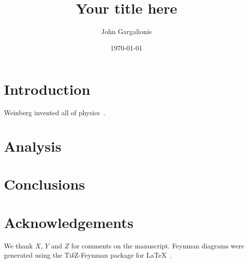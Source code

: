 \documentclass[
reprint,    %
nofootinbib, %
aps,
prd,
amsmath,
amssymb,
]{revtex4-2}
\begin{document}
\title{Your title here}

\date{\today}

\author{John Gargalionis}


\begin{abstract}
  \lipsum[1]
\end{abstract}

\maketitle

\section*{Introduction}
Weinberg invented all of physics~\cite{Weinberg:1967tq}. \lipsum[2-5]

\section*{Analysis}
\lipsum[6-10]

\section*{Conclusions}
\lipsum[11]

\section*{Acknowledgements}

We thank $X$, $Y$ and $Z$ for comments on the manuscript. Feynman diagrams were
generated using the Ti\textit{k}Z-Feynman package for
\LaTeX~\cite{Ellis:2016jkw}.


\end{document}

